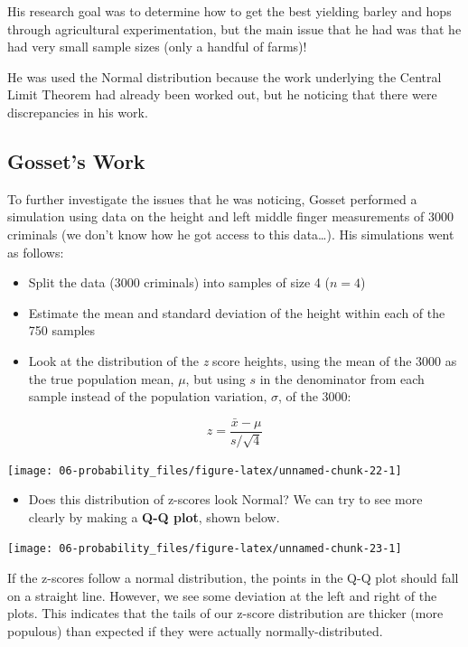 \documentclass[
]{book}
\providecommand{\tightlist}{%
  \setlength{\itemsep}{0pt}\setlength{\parskip}{0pt}}
\begin{document}
His research goal was to determine how to get the best yielding barley and hops through agricultural experimentation, but the main issue that he had was that he had very small sample sizes (only a handful of farms)!

He was used the Normal distribution because the work underlying the Central Limit Theorem had already been worked out, but he noticing that there were discrepancies in his work.

\subsection{Gosset's Work}\label{gossets-work}

To further investigate the issues that he was noticing, Gosset performed a simulation using data on the height and left middle finger measurements of 3000 criminals (we don't know how he got access to this data\ldots). His simulations went as follows:

\begin{itemize}
\tightlist
\item
  Split the data (3000 criminals) into samples of size 4 (\(n=4\))
\item
  Estimate the mean and standard deviation of the height within each of the 750 samples
\item
  Look at the distribution of the \emph{z} score heights, using the mean of the 3000 as the true population mean, \(\mu\), but using \(s\) in the denominator from each sample instead of the population variation, \(\sigma\), of the 3000:
\end{itemize}

\[ z = \frac{\bar{x} - \mu}{s/\sqrt{4}}\]

\begin{center}\texttt{[image: 06-probability\_files/figure-latex/unnamed-chunk-22-1]} \end{center}

\begin{itemize}
\tightlist
\item
  Does this distribution of z-scores look Normal? We can try to see more clearly by making a \textbf{Q-Q plot}, shown below.
\end{itemize}

\begin{center}\texttt{[image: 06-probability\_files/figure-latex/unnamed-chunk-23-1]} \end{center}

If the z-scores follow a normal distribution, the points in the Q-Q plot should fall on a straight line. However, we see some deviation at the left and right of the plots. This indicates that the tails of our z-score distribution are thicker (more populous) than expected if they were actually normally-distributed.
\end{document}
